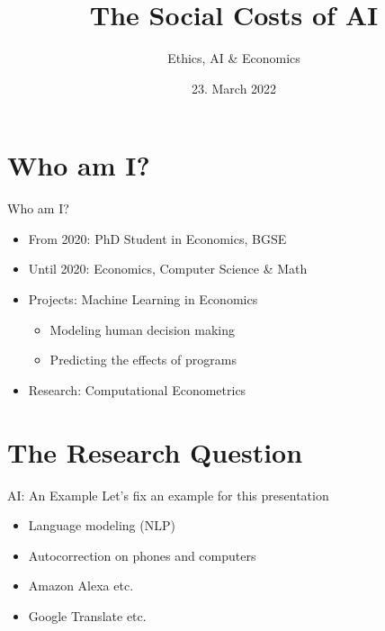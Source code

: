 \documentclass[serif, mathsansserif, aspectratio=169]{beamer}   %
\title{{\LARGE The Social Costs of AI}}
\subtitle{{\small Ethics, AI \& Economics}}
\author{}
\date{23. March 2022}
\begin{document}
\begin{frame}
    \maketitle
\end{frame}

\begin{frame}
    \tableofcontents[hideallsubsections]
\end{frame}

\section{Who am I?}
\begin{frame}{Who am I?}
    \begin{itemize}
        \setlength\itemsep{1em}
        \item[\labelitem] From 2020: PhD Student in Economics, BGSE
        \item[\labelitem] Until 2020: Economics, Computer Science \& Math
        \item[\labelitem] Projects: Machine Learning in Economics
            \begin{itemize}
                \setlength\itemsep{0.5em}
                \item Modeling human decision making
                \item Predicting the effects of programs
            \end{itemize}
        \item[\labelitem] Research: Computational Econometrics
    \end{itemize}
\end{frame}


\section{The Research Question}
\begin{frame}{AI: An Example}
    \vspace{-1cm}
    Let's fix an example for this presentation
    \vspace{1cm}
    \begin{itemize}
        \setlength\itemsep{1em}
        \item[\labelitem] Language modeling (NLP)
        \item[\labelitem] Autocorrection on phones and computers
        \item[\labelitem] Amazon Alexa etc.
        \item[\labelitem] Google Translate etc.
    \end{itemize}
\end{frame}
\end{document}
